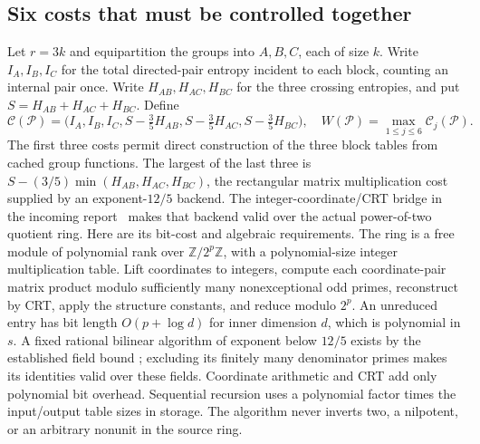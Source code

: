 \subsection{Six costs that must be controlled together}
Let $r=3k$ and equipartition the groups into $A,B,C$, each of size $k$.
Write $I_A,I_B,I_C$ for the total directed-pair entropy incident to each
block, counting an internal pair once.  Write $H_{AB},H_{AC},H_{BC}$
for the three crossing entropies, and put
$S=H_{AB}+H_{AC}+H_{BC}$.  Define
\begin{equation}\label{eq:joint-costs}
 \mathcal C(\mathcal P)=
 \bigl(I_A,I_B,I_C,
       S-\tfrac35H_{AB},S-\tfrac35H_{AC},S-\tfrac35H_{BC}\bigr),
 \quad W(\mathcal P)=\max_{1\le j\le6}\mathcal C_j(\mathcal P).
\end{equation}
The first three costs permit direct construction of the three block
tables from cached group functions.  The largest of the last three is
$S-(3/5)\min(H_{AB},H_{AC},H_{BC})$, the rectangular matrix multiplication
cost supplied by an exponent-$12/5$ backend.  The integer-coordinate/CRT bridge in the incoming report~\cite{incomingtree}
makes that backend valid over the actual power-of-two quotient ring.
Here are its bit-cost and algebraic requirements. The ring is a free module
of polynomial rank over $\mathbb Z/2^p\mathbb Z$, with a polynomial-size
integer multiplication table. Lift coordinates to integers, compute each
coordinate-pair matrix product modulo sufficiently many nonexceptional odd
primes, reconstruct by CRT, apply the structure constants, and reduce
modulo $2^p$. An unreduced entry has bit length $O(p+\log d)$ for inner
dimension $d$, which is polynomial in $s$. A fixed rational bilinear
algorithm of exponent below $12/5$ exists by the established field bound
\cite{mm}; excluding its finitely many denominator primes makes its
identities valid over these fields. Coordinate arithmetic and CRT add only
polynomial bit overhead. Sequential recursion uses a polynomial factor
times the input/output table sizes in storage. The algorithm never inverts
two, a nilpotent, or an arbitrary nonunit in the source ring.

